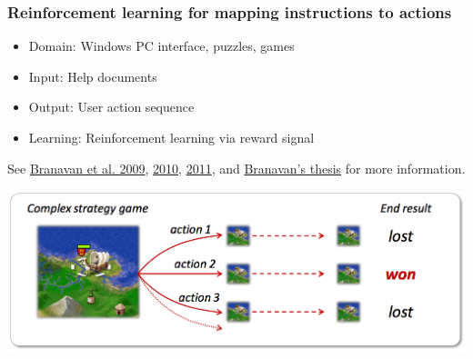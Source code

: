 \documentclass[ignorenonframetext]{beamer}
\begin{document}
\begin{frame}\frametitle{Reinforcement learning for mapping instructions to actions}
\begin{itemize}
\item Domain: Windows PC interface, puzzles, games
\item Input: Help documents
\item Output: User action sequence
\item Learning: Reinforcement learning via reward signal
\end{itemize}
See \href{http://groups.csail.mit.edu/rbg/code/rl}{Branavan et al. 2009},
\href{http://groups.csail.mit.edu/rbg/code/rl-hli}{2010},
\href{http://groups.csail.mit.edu/rbg/code/civ}{2011}, and
\href{http://people.csail.mit.edu/branavan}{Branavan's thesis}
for more information.
\begin{center}
\href{http://groups.csail.mit.edu/rbg/code/civ}{
\includegraphics[width=\textwidth]{images/branavan-civ2.png}}
\end{center}
\end{frame}
\end{document}

